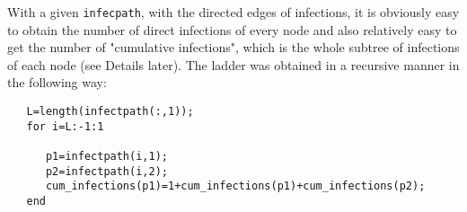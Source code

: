 With a given \texttt{infecpath}, with the directed edges of infections, it is obviously easy to obtain the number of direct infections of every node and also relatively easy to get the number of "cumulative infections", which is the whole subtree of infections of each node (see Details later). The ladder was obtained in a recursive manner in the following way:

\begin{lstlisting} 
   L=length(infectpath(:,1));
   for i=L:-1:1
      
      p1=infectpath(i,1);
      p2=infectpath(i,2);
      cum_infections(p1)=1+cum_infections(p1)+cum_infections(p2);
   end

\end{lstlisting}

